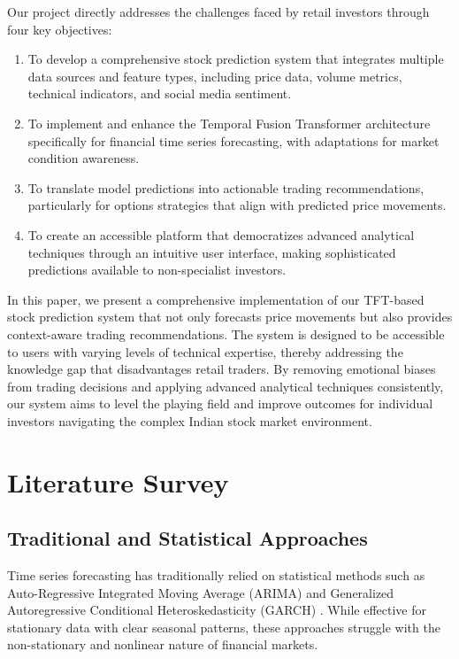 \documentclass[conference]{IEEEtran}
\begin{document}
Our project directly addresses the challenges faced by retail investors through four key objectives:

\begin{enumerate}
\item To develop a comprehensive stock prediction system that integrates multiple data sources and feature types, including price data, volume metrics, technical indicators, and social media sentiment.

\item To implement and enhance the Temporal Fusion Transformer architecture specifically for financial time series forecasting, with adaptations for market condition awareness.

\item To translate model predictions into actionable trading recommendations, particularly for options strategies that align with predicted price movements.

\item To create an accessible platform that democratizes advanced analytical techniques through an intuitive user interface, making sophisticated predictions available to non-specialist investors.
\end{enumerate}

In this paper, we present a comprehensive implementation of our TFT-based stock prediction system that not only forecasts price movements but also provides context-aware trading recommendations. The system is designed to be accessible to users with varying levels of technical expertise, thereby addressing the knowledge gap that disadvantages retail traders. By removing emotional biases from trading decisions and applying advanced analytical techniques consistently, our system aims to level the playing field and improve outcomes for individual investors navigating the complex Indian stock market environment.

\section{Literature Survey}

\subsection{Traditional and Statistical Approaches}
Time series forecasting has traditionally relied on statistical methods such as Auto-Regressive Integrated Moving Average (ARIMA) and Generalized Autoregressive Conditional Heteroskedasticity (GARCH) \cite{box2015time}. While effective for stationary data with clear seasonal patterns, these approaches struggle with the non-stationary and nonlinear nature of financial markets.
\end{document}

